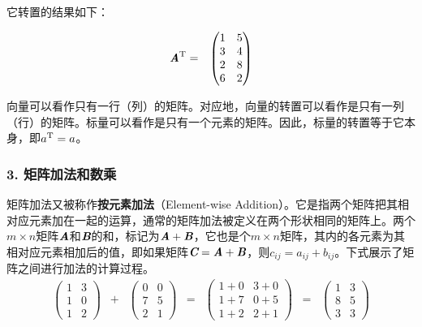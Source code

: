 \noindent 它转置的结果如下：

\begin{eqnarray}
{\textbf{\em A}}^{\textrm T} & = &\begin{pmatrix} 1 & 5\\3 & 4\\2 & 8\\6 & 2\end{pmatrix}
\label{eq:9-101}
\end{eqnarray}

\parinterval 向量可以看作只有一行（列）的矩阵。对应地，向量的转置可以看作是只有一列（行）的矩阵。标量可以看作是只有一个元素的矩阵。因此，标量的转置等于它本身，即$ a^{\textrm T}=a $。


\subsubsection{3. 矩阵加法和数乘}

\parinterval 矩阵加法又被称作{\small\sffamily\bfseries{按元素加法}}（Element-wise Addition）。它是指两个矩阵把其相对应元素加在一起的运算，通常的矩阵加法被定义在两个形状相同的矩阵上。两个$ m\times n $矩阵$ \textbf{\em A}$和$ \textbf{\em B} $的和，标记为$ \textbf{\em A} + \textbf{\em B}$，它也是个$ m\times n $矩阵，其内的各元素为其相对应元素相加后的值，即如果矩阵$ {\textbf{\em C}}= {\textbf{\em A}} + {\textbf{\em B}} $，则$ c_{ij} = a_{ij} + b_{ij} $。下式展示了矩阵之间进行加法的计算过程。
\begin{eqnarray}
\begin{pmatrix}
   1 & 3\\
   1 & 0\\
   1 & 2
\end{pmatrix}\;\;+\;\;\begin{pmatrix}
   0 & 0\\
   7 & 5\\
   2 & 1
\end{pmatrix}&=&\begin{pmatrix}
   1+0 & 3+0\\
   1+7 & 0+5\\
   1+2 & 2+1
\end{pmatrix}\;\;=\;\;\begin{pmatrix}
   1 & 3\\
   8 & 5\\
   3 & 3
\end{pmatrix}
\label{eq:9-4}
\end{eqnarray}

